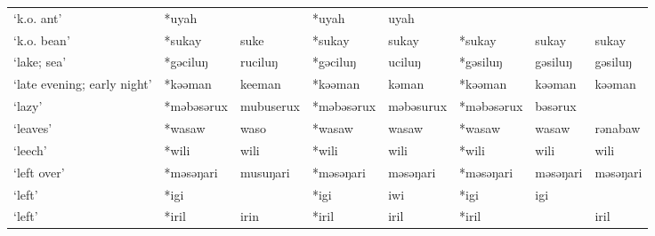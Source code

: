 \begin{landscape}
\begin{longtable}[c]{@{}p{3cm}<{\raggedright}p{2.75cm}<{\raggedright}p{2.75cm}<{\raggedright}p{2.75cm}<{\raggedright}p{2.75cm}<{\raggedright}p{2.75cm}<{\raggedright}p{2.75cm}<{\raggedright}p{2.75cm}<{\raggedright}@{}}
`k.o. ant'                                           & *uyah        &                               & *uyah          & uyah                       &                  &                          &                                   \\
`k.o. bean'                                          & *sukay       & suke                          & *sukay         & sukay                      & *sukay           & sukay                    & sukay                             \\
`lake; sea'                                          & *gəciluŋ     & ruciluŋ                       & *gəciluŋ       & uciluŋ                     & *gəsiluŋ         & gəsiluŋ                  & gəsiluŋ                           \\
`late evening; early night'                          & *kəəman      & keeman                        & *kəəman        & kəman                      & *kəəman          & kəəman                   & kəəman                            \\
`lazy'                                               & *məbəsərux   & mubuserux                     & *məbəsərux     & məbəsurux                  & *məbəsərux       & bəsərux                  &                                   \\
`leaves'                                             & *wasaw       & waso                          & *wasaw         & wasaw                      & *wasaw           & wasaw                    & rənabaw                           \\
`leech'                                              & *wili        & wili                          & *wili          & wili                       & *wili            & wili                     & wili                              \\
`left over'                                          & *məsəŋari    & musuŋari                      & *məsəŋari      & məsəŋari                   & *məsəŋari        & məsəŋari                 & məsəŋari                          \\
`left'                                               & *igi         &                               & *igi           & iwi                        & *igi             & igi                      &                                   \\
`left'                                               & *iril        & irin                          & *iril          & iril                       & *iril            &                          & iril                              \\

\end{longtable}
\end{landscape}

